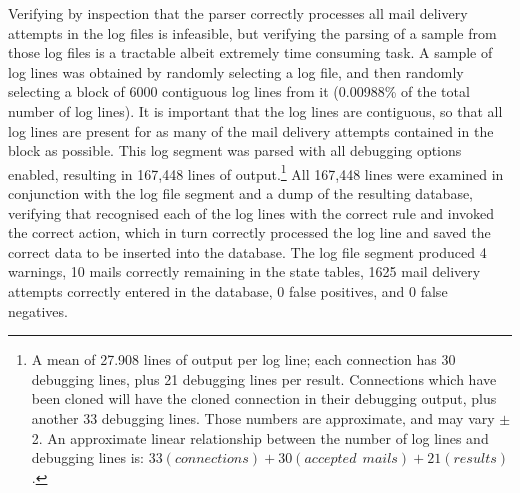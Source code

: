 
Verifying by inspection that the parser correctly processes all
\numberOFconnectionsINlogFILES{} mail delivery attempts in the
\numberOFlogFILES{} log files is infeasible, but verifying the parsing of a
sample from those log files is a tractable albeit extremely time consuming
task.  A sample of log lines was obtained by randomly selecting a log file,
and then randomly selecting a block of 6000 contiguous log lines from it
(0.00988\% of the total number of log lines).  It is important that the log
lines are contiguous, so that all log lines are present for as many of the
mail delivery attempts contained in the block as possible.  This log
segment was parsed with all debugging options enabled, resulting in 167,448
lines of output.\footnote{A mean of 27.908 lines of output per log line;
each connection has 30 debugging lines, plus 21 debugging lines per result.
Connections which have been cloned will have the cloned connection in their
debugging output, plus another 33 debugging lines.  Those numbers are
approximate, and may vary $\pm{}$ 2.  An approximate linear relationship
between the number of log lines and debugging lines is: $33(connections) +
30(accepted~~mails) + 21(results)$.} All 167,448 lines were examined in
conjunction with the log file segment and a dump of the resulting database,
verifying that \parsername{} recognised each of the log lines with the
correct rule and invoked the correct action, which in turn correctly
processed the log line and saved the correct data to be inserted into the
database.  The log file segment produced 4 warnings, 10 mails correctly
remaining in the state tables, 1625 mail delivery attempts correctly
entered in the database, 0 false positives, and 0 false negatives.


